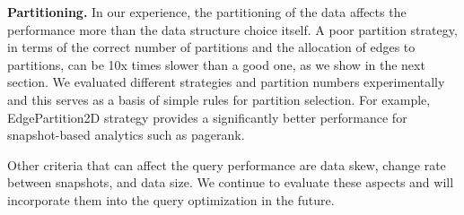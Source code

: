 
{\bf Partitioning.} In our experience, the partitioning of the data
affects the performance more than the data structure choice itself.  A
poor partition strategy, in terms of the correct number of partitions
and the allocation of edges to partitions, can be 10x times slower
than a good one, as we show in the next section.  We evaluated
different strategies and partition numbers experimentally and this
serves as a basis of simple rules for partition selection.  For
example, EdgePartition2D strategy provides a significantly better
performance for snapshot-based analytics such as pagerank.

Other criteria that can affect the query performance are data skew,
change rate between snapshots, and data size.  We continue to evaluate
these aspects and will incorporate them into the query optimization in
the future.
